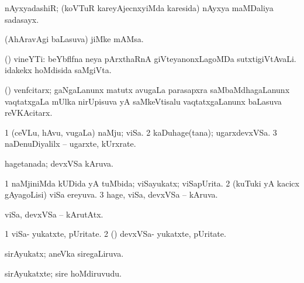 \bentry
{} 
\gl{\nA}
\expl{}
\bmng
\emng
\eentry

\bentry
{} 
\gl{\nA}
\expl{}
\bmng
 nAyxyadashiR; (koVTuR kareyAjecnxyiMda karesida) nAyxya maMDaliya sadasayx. 
\emng
\eentry

\bentry
{} 
\gl{\nA}
\expl{}
\bmng
\emng
\eentry

\bentry
{} 
\gl{\nA}
\expl{}
\bmng
 (AhAravAgi baLasuva) jiMke mAMsa. 
\emng
\eentry

\bentry
{} 
\gl{\nA}
\expl{}
\bmng
 (\ca) vineYTi: 
\banum
{} beYbflfna neya pArxthaRnA giVteyanonxLagoMDa sutxtigiVtAvaLi. 
 idakekx hoMdisida saMgiVta. 
\eanum
\emng
\eentry

\bentry
{} 
\gl{\nA}
\expl{}
\bmng
 (\ga) venfcitarx; gaNgaLanunx matutx avugaLa parasapxra saMbaMdhagaLanunx vaqtatxgaLa mUlka nirUpisuva yA saMkeVtisalu vaqtatxgaLanunx baLasuva reVKAcitarx. 
\emng
\eentry

\bentry
{} 
\gl{\nA}
\expl{}
\bmng
\bnum
\num{1} (ceVLu, hAvu, \mo vugaLa) naMju; viSa. 
\num{2} kaDuhage(tana); ugarxdevxVSa. 
\num{3} naDenuDiyalilx -- ugarxte, kUrxrate. 
\enum
\emng
\eentry

\bentry
{} 
\gl{\gu}
\expl{}
\bmng
 hagetanada; devxVSa kAruva. 
\emng
\eentry

\bentry
{} 
\gl{\gu}
\expl{}
\bmng
\bnum
\num{1} naMjiniMda kUDida yA tuMbida; viSayukatx; viSapUrita. 
\num{2} (kuTuki yA kacicx gAyagoLisi) viSa ereyuva. 
\num{3} hage, viSa, devxVSa -- kAruva. 
\enum
\emng
\eentry

\bentry
{} 
\gl{\kirxvi}
\expl{}
\bmng
 viSa, devxVSa -- kArutAtx. 
\emng
\eentry

\bentry
{} 
\gl{\nA}
\expl{}
\bmng
\bnum
\num{1} viSa- yukatxte, pUritate. 
\num{2} (\rUpa) devxVSa- yukatxte, pUritate. 
\enum
\emng
\eentry

\bentry
{} 
\gl{\gu}
\expl{}
\bmng
 sirAyukatx; aneVka siregaLiruva. 
\emng
\eentry

\bentry
{} 
\gl{\nA}
\expl{}
\bmng
 sirAyukatxte; sire hoMdiruvudu. 
\emng
\eentry

